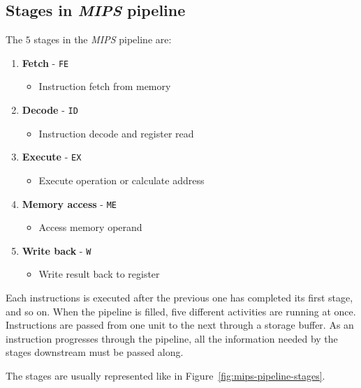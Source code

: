 \documentclass[english]{article}
\begin{document}
\subsection{Stages in \textit{MIPS} pipeline}

The \(5\) stages in the \textit{MIPS} pipeline are:

\begin{enumerate}
  \item \textbf{Fetch} - \texttt{FE}
        \begin{itemize}[label=\(\rightarrow\)]
          \item Instruction fetch from memory
        \end{itemize}
  \item \textbf{Decode} - \texttt{ID}
        \begin{itemize}[label=\(\rightarrow\)]
          \item Instruction decode and register read
        \end{itemize}
  \item \textbf{Execute} - \texttt{EX}
        \begin{itemize}[label=\(\rightarrow\)]
          \item Execute operation or calculate address
        \end{itemize}
  \item \textbf{Memory access} - \texttt{ME}
        \begin{itemize}[label=\(\rightarrow\)]
          \item Access memory operand
        \end{itemize}
  \item \textbf{Write back} - \texttt{W}
        \begin{itemize}[label=\(\rightarrow\)]
          \item Write result back to register
        \end{itemize}
\end{enumerate}

Each instructions is executed after the previous one has completed its first stage, and so on.
When the pipeline is filled, five different activities are running at once.
Instructions are passed from one unit to the next through a storage buffer.
As an instruction progresses through the pipeline, all the information needed by the stages downstream must be passed along.

The stages are usually represented like in Figure~\ref{fig:mips-pipeline-stages}.
\end{document}
